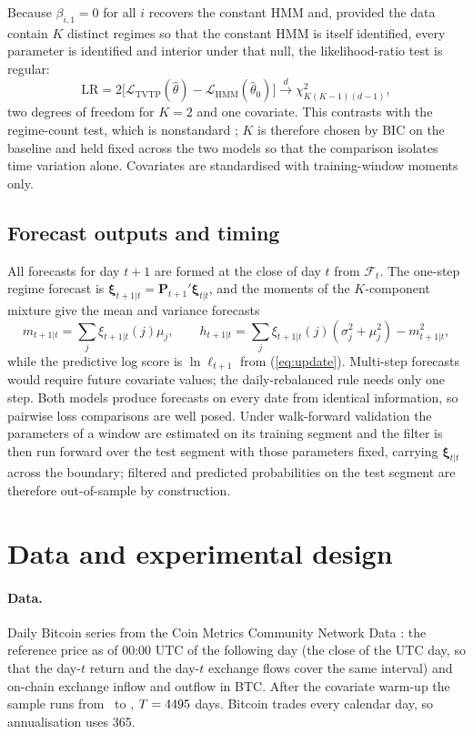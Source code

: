 \documentclass[11pt,a4paper]{article}
\newcommand{\F}{\mathcal{F}}
\newcommand{\bxi}{\bm{\xi}}
\newcommand{\bP}{\mathbf{P}}
\newcommand{\LL}{\mathcal{L}}
\begin{document}
Because $\beta_{i,1}=0$ for all $i$ recovers the constant HMM and, provided the data contain $K$ distinct regimes so that the constant HMM is itself identified, every parameter is identified and interior under that null, the likelihood-ratio test is regular:
\begin{equation}\label{eq:lr}
\mathrm{LR}=2\bigl[\LL_{\mathrm{TVTP}}(\hat\theta)-\LL_{\mathrm{HMM}}(\hat\theta_0)\bigr]\xrightarrow{d}\chi^2_{K(K-1)(d-1)},
\end{equation}
two degrees of freedom for $K=2$ and one covariate. This contrasts with the regime-count test, which is nonstandard \citep{hansen1992}; $K$ is therefore chosen by BIC on the baseline and held fixed across the two models so that the comparison isolates time variation alone. Covariates are standardised with training-window moments only.

\subsection{Forecast outputs and timing}
All forecasts for day $t+1$ are formed at the close of day $t$ from $\F_t$. The one-step regime forecast is $\bxi_{t+1|t}=\bP_{t+1}'\bxi_{t|t}$, and the moments of the $K$-component mixture give the mean and variance forecasts
\begin{equation}\label{eq:fc}
m_{t+1|t}=\sum_j\xi_{t+1|t}(j)\mu_j,\qquad
h_{t+1|t}=\sum_j\xi_{t+1|t}(j)(\sigma_j^2+\mu_j^2)-m_{t+1|t}^2 ,
\end{equation}
while the predictive log score is $\ln\ell_{t+1}$ from (\ref{eq:update}). Multi-step forecasts would require future covariate values; the daily-rebalanced rule needs only one step. Both models produce forecasts on every date from identical information, so pairwise loss comparisons are well posed. Under walk-forward validation the parameters of a window are estimated on its training segment and the filter is then run forward over the test segment with those parameters fixed, carrying $\bxi_{t|t}$ across the boundary; filtered and predicted probabilities on the test segment are therefore out-of-sample by construction.

\section{Data and experimental design}\label{sec:design}
\paragraph{Data.} Daily Bitcoin series from the Coin Metrics Community Network Data \citep{coinmetrics}: the reference price as of 00:00 UTC of the following day (the close of the UTC day, so that the day-$t$ return and the day-$t$ exchange flows cover the same interval) and on-chain exchange inflow and outflow in BTC. After the covariate warm-up the sample runs from \DataStart\ to \DataEnd, $T=4495$ days. Bitcoin trades every calendar day, so annualisation uses 365.
\end{document}
